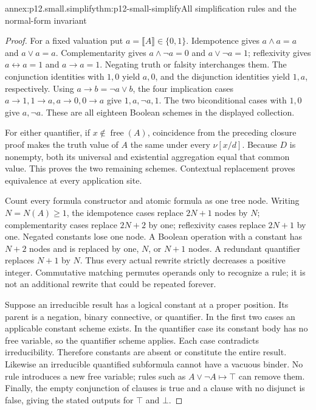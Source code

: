\begin{annexitem}{annex:p12.small.simplify}{thm:p12-small-simplify}{All simplification rules and the normal-form invariant}
\begin{proof}
For a fixed valuation put \(a=\llbracket A\rrbracket\in\{0,1\}\).
Idempotence gives \(a\land a=a\) and \(a\lor a=a\).
Complementarity gives \(a\land\neg a=0\) and
\(a\lor\neg a=1\); reflexivity gives \(a\leftrightarrow a=1\)
and \(a\to a=1\). Negating truth or falsity interchanges them.
The conjunction identities with \(1,0\) yield \(a,0\), and the
disjunction identities yield \(1,a\), respectively. Using
\(a\to b=\neg a\lor b\), the four implication cases
\(a\to1,1\to a,a\to0,0\to a\) give \(1,a,\neg a,1\).
The two biconditional cases with \(1,0\) give \(a,\neg a\).
These are all eighteen Boolean schemes in the displayed collection.

For either quantifier, if \(x\notin\operatorname{free}(A)\),
coincidence from the preceding closure proof makes the truth value
of \(A\) the same under every \(\nu[x/d]\). Because \(D\)
is nonempty, both its universal and existential aggregation equal
that common value. This proves the two remaining schemes.
Contextual replacement proves equivalence at every application site.

Count every formula constructor and atomic formula as one tree node.
Writing \(N=N(A)\ge1\), the idempotence cases replace
\(2N+1\) nodes by \(N\); complementarity cases replace
\(2N+2\) by one; reflexivity cases replace \(2N+1\) by one.
Negated constants lose one node. A Boolean operation with a constant
has \(N+2\) nodes and is replaced by one, \(N\), or \(N+1\)
nodes. A redundant quantifier replaces \(N+1\) by \(N\).
Thus every actual rewrite strictly decreases a positive integer.
Commutative matching permutes operands only to recognize a rule;
it is not an additional rewrite that could be repeated forever.

Suppose an irreducible result has a logical constant at a proper
position. Its parent is a negation, binary connective, or quantifier.
In the first two cases an applicable constant scheme exists. In the
quantifier case its constant body has no free variable, so the
quantifier scheme applies. Each case contradicts irreducibility.
Therefore constants are absent or constitute the entire result.
Likewise an irreducible quantified subformula cannot have a vacuous
binder. No rule introduces a new free variable; rules such as
\(A\lor\neg A\mapsto\top\) can remove them. Finally, the
empty conjunction of clauses is true and a clause with no disjunct
is false, giving the stated outputs for \(\top\) and \(\bot\).
\end{proof}
\end{annexitem}

